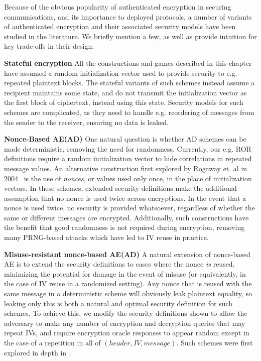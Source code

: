 Because of the obvious popularity of authenticated encryption in securing communications, and its importance to deployed protocols, a number of 
variants of authenticated encryption and their associated security models have been studied in the literature.  We briefly mention a few, as well as 
provide intuition for key trade-offs in their design.

\textbf{Stateful encryption} All the constructions and games described in this chapter have assumed a random initialization vector used to provide 
security to e.g. repeated plaintext blocks.  The stateful variants of such schemes instead assume a recipient maintains some state, and do not 
transmit the initialization vector as the first block of ciphertext, instead using this state.  Security models for such schemes are complicated, as 
they need to handle e.g. reordering of messages from the sender to the receiver, ensuring no data is leaked.

\textbf{Nonce-Based AE(AD)} One natural question is whether AD schemes can be made deterministic, removing the need for randomness.  Currently, our 
e.g. ROR definitions require a random initialization vector to hide correlations in repeated message values.  An alternative construction first 
explored by Rogaway et. al in 2004~\cite{Rogaway2004} is the use of \emph{nonces}, or values used only once, in the place of initialization vectors. 
In these schemes, extended security definitions make the additional assumption that no nonce is used twice across encryptions.  In the event that a 
nonce is used twice, no security is provided whatsoever, regardless of whether the same or different messages are encrypted.  Additionally, such 
constructions have the benefit that good randomness is not required during encryption, removing many PRNG-based attacks which have led to IV reuse in 
practice.

\textbf{Misuse-resistant nonce-based AE(AD)} A natural extension of nonce-based AE is to extend the security definitions to cases where the nonce 
\emph{is} reused, minimizing the potential for damage in the event of misuse (or equivalently, in the case of IV reuse in a randomized setting).  Any 
nonce that is reused with the same message in a deterministic scheme will obviously leak plaintext equality, so leaking only this is both a natural 
and optimal security definition for such schemes.  To achieve this, we modify the security definitions shown to allow the adversary to make any number 
of encryption and decryption queries that may repeat IVs, and require encryption oracle responses to appear random except in the case of a repetition 
in all of $(header, IV, message)$.  Such schemes were first explored in depth in~\cite{Rogaway2006}.



